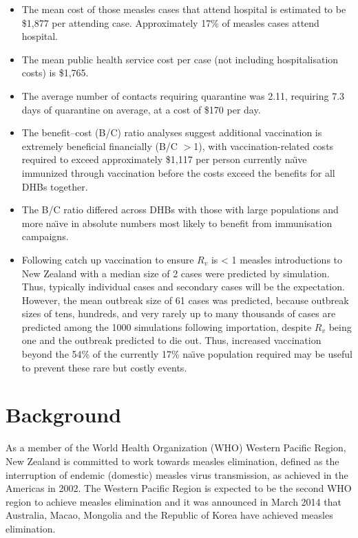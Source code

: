 \documentclass{article}
\begin{document}
\begin{itemize}
\item The mean cost of those measles cases that attend hospital is estimated to be \$1,877 per attending case. Approximately 17\% of measles cases attend hospital.
\item The mean public health service cost per case (not including hospitalisation costs) is \$1,765.
\item The average number of contacts requiring quarantine was 2.11, requiring 7.3 days of quarantine on average, at a cost of \$170 per day.
\item The benefit--cost (B/C) ratio analyses suggest additional vaccination is extremely beneficial financially (B/C $>$1), with vaccination-related costs required to exceed approximately \$1,117 per person currently na\"{\i}ve immunized through vaccination before the costs exceed the benefits for all DHBs together.
\item The B/C ratio differed across DHBs with those with large populations and more na\"{\i}ve in absolute numbers most likely to benefit from immunisation campaigns. 
\item Following catch up vaccination to ensure $R_v$ is < 1 measles introductions to New Zealand with a median size of 2 cases were predicted by simulation. Thus, typically individual cases and secondary cases will be the expectation. However, the mean outbreak size of 61 cases was predicted, because outbreak sizes of tens, hundreds, and very rarely up to many thousands of cases are predicted among the 1000 simulations following importation, despite $R_v$ being one and the outbreak predicted to die out. Thus, increased vaccination beyond the 54\% of the currently 17\% na\"{\i}ve population required may be useful to prevent these rare but costly events.
\end{itemize}

\section{Background}

As a member of the World Health Organization (WHO) Western Pacific Region, New Zealand is committed to work towards measles elimination, defined as the interruption of endemic (domestic) measles virus transmission, as achieved in the Americas in 2002. The Western Pacific Region is expected to be the second WHO region to  achieve measles elimination and it was announced in March 2014 that Australia, Macao, Mongolia and the Republic of Korea have achieved measles elimination.
\end{document}
